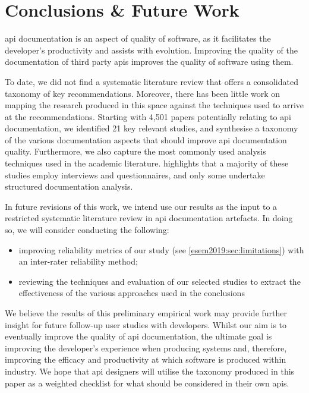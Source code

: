 \section{Conclusions \& Future Work}
\label{esem2019:sec:conclusions}

\gls{api} documentation is an aspect of quality of software, as it facilitates the developer's productivity and assists with evolution. Improving the quality of the documentation of third party \glspl{api} improves the quality of software using them.

To date, we did not find a systematic literature review that offers a consolidated taxonomy of key recommendations. Moreover, there has been little work on mapping the research produced in this space against the techniques used to arrive at the recommendations.
Starting with 4,501 papers potentially relating to \gls{api} documentation, we identified 21 key relevant studies, and synthesise a taxonomy of the various documentation aspects that should improve \gls{api} documentation quality. Furthermore, we also capture the most commonly used analysis techniques used in the academic literature.  highlights that a majority of these studies employ interviews and questionnaires, and only some undertake structured documentation analysis. 

In future revisions of this work, we intend use our results as the input to a restricted systematic literature review in \gls{api} documentation artefacts. In doing so, we will consider conducting the following:

\begin{itemize}
  \item improving reliability metrics of our study (see \cref{esem2019:sec:limitations}) with an inter-rater reliability method;
  \item reviewing the techniques and evaluation of our selected studies to extract the effectiveness of the various approaches used in the conclusions
\end{itemize}

We believe the results of this preliminary empirical work may provide further insight for future follow-up user studies with developers. Whilst our aim is to eventually improve the quality of \gls{api} documentation, the ultimate goal is  improving the developer's experience when producing systems and, therefore, improving the efficacy and productivity at which software is produced within industry.   We hope that \gls{api} designers will utilise the taxonomy produced in this paper as a weighted checklist for what should be considered in their own \glspl{api}.

